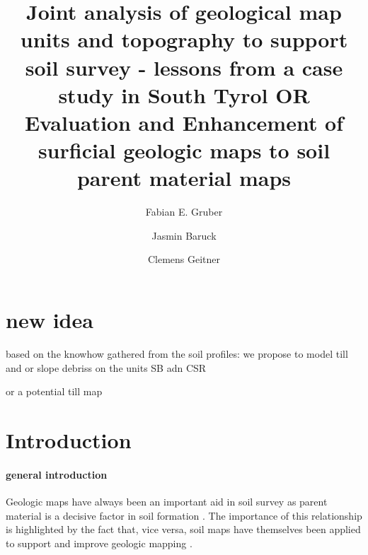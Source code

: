 \documentclass[preprint,12pt,authoryear]{elsarticle}
\begin{document}
\begin{frontmatter}

\title{Joint analysis of geological map units and topography to support soil survey - lessons from a case study in South Tyrol OR Evaluation and Enhancement of surficial geologic maps to soil parent material maps}



\author[mymainadress]{Fabian E. Gruber}
\author[mymainadress]{Jasmin Baruck}
\author[mymainadress]{Clemens Geitner}



\address[mymainadress]{Institute of Geography, University of Innsbruck, Innrain 52f, 6020 Innsbruck, Austria}

\begin{abstract}

\end{abstract}

\begin{keyword}

\end{keyword}

\end{frontmatter}

\linenumbers
\section{new idea}
based on the knowhow gathered from the soil profiles: we propose to model till and or slope debriss on the units SB adn CSR

or a potential till map
\section{Introduction}
\paragraph{general introduction}
Geologic maps have always been an important aid in soil survey as parent material is a decisive factor in soil formation \citep{Jenny1941}. The importance of this relationship is highlighted by the fact that, vice versa, soil maps have themselves been applied to support and improve geologic mapping \citep{Brevik2015}. 
\end{document}
